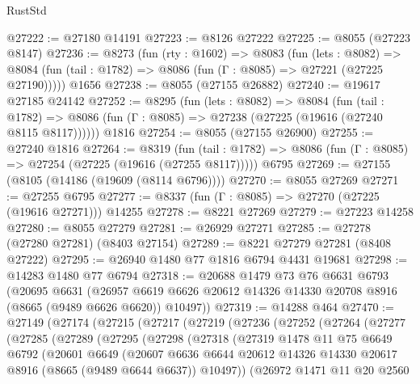 \begin{lexlean}{RustStd}
\begin{coremodule}
@27222 := @27180 @14191
@27223 := @8126 @27222
@27225 := @8055 (@27223 @8147)
@27236 := @8273
    (fun (rty : @1602) =>
    @8083
      (fun (lets : @8082) =>
      @8084 (fun (tail : @1782) => @8086 (fun (Γ : @8085) => @27221 (@27225 @27190)))))
    @1656
@27238 := @8055 (@27155 @26882)
@27240 := @19617 @27185 @24142
@27252 := @8295
    (fun (lets : @8082) =>
    @8084
      (fun (tail : @1782) =>
      @8086 (fun (Γ : @8085) => @27238 (@27225 (@19616 (@27240 @8115 @8117))))))
    @1816
@27254 := @8055 (@27155 @26900)
@27255 := @27240 @1816
@27264 := @8319
    (fun (tail : @1782) => @8086 (fun (Γ : @8085) => @27254 (@27225 (@19616 (@27255 @8117)))))
    @6795
@27269 := @27155 (@8105 (@14186 (@19609 (@8114 @6796))))
@27270 := @8055 @27269
@27271 := @27255 @6795
@27277 := @8337 (fun (Γ : @8085) => @27270 (@27225 (@19616 @27271))) @14255
@27278 := @8221 @27269
@27279 := @27223 @14258
@27280 := @8055 @27279
@27281 := @26929 @27271
@27285 := @27278 (@27280 @27281) (@8403 @27154)
@27289 := @8221 @27279 @27281 (@8408 @27222)
@27295 := @26940 @1480 @77 @1816 @6794 @4431 @19681
@27298 := @14283 @1480 @77 @6794
@27318 := @20688
    @1479
    @73
    @76
    @6631
    @6793
    (@20695
      @6631
      (@26957 @6619 @6626 @20612 @14326 @14330 @20708 @8916 (@8665 (@9489 @6626 @6620)) @10497))
@27319 := @14288 @464
@27470 := @27149
    (@27174
      (@27215
        (@27217
          (@27219
            (@27236
              (@27252
                (@27264
                  (@27277
                    (@27285
                      (@27289
                        (@27295
                          (@27298
                            (@27318
                              (@27319
                                @1478
                                @11
                                @75
                                @6649
                                @6792
                                (@20601
                                  @6649
                                  (@20607
                                    @6636
                                    @6644
                                    @20612
                                    @14326
                                    @14330
                                    @20617
                                    @8916
                                    (@8665 (@9489 @6644 @6637))
                                    @10497))
                                (@26972
                                  @1471
                                  @11
                                  @20
                                  @2560

\end{coremodule}
\end{lexlean}
